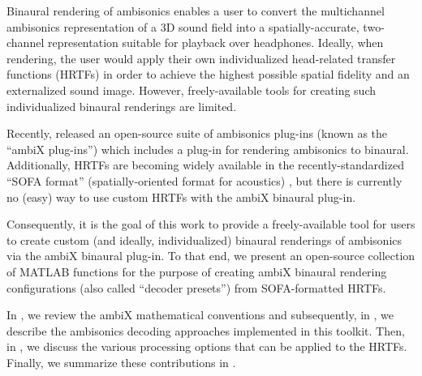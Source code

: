 Binaural rendering of ambisonics enables a user to convert the multichannel ambisonics representation of a 3D sound field
into a spatially-accurate, two-channel representation suitable for playback over headphones.
Ideally, when rendering, the user would apply their own individualized head-related transfer functions (HRTFs)
in order to achieve the highest possible spatial fidelity and an externalized sound image.
However, freely-available tools for creating such individualized binaural renderings are limited.


Recently, \citet{Kronlachner2013} released an open-source suite of ambisonics plug-ins
(known as the ``ambiX plug-ins'') which includes a plug-in for rendering ambisonics to binaural.
Additionally, HRTFs are becoming widely available in the recently-standardized ``SOFA format''
(spatially-oriented format for acoustics) \citep{AES69-2015},
but there is currently no (easy) way to use custom HRTFs with the ambiX binaural plug-in.

Consequently, it is the goal of this work to provide a freely-available tool for users to create custom
(and ideally, individualized) binaural renderings of ambisonics via the ambiX binaural plug-in.
To that end, we present an open-source collection of MATLAB functions %
for the purpose of creating ambiX binaural rendering configurations (also called ``decoder presets'')
from SOFA-formatted HRTFs.

In , we review the ambiX mathematical conventions and subsequently,
in , we describe the ambisonics decoding approaches implemented in this toolkit.
Then, in , we discuss the various processing options that can be applied to the HRTFs.
Finally, we summarize these contributions in .